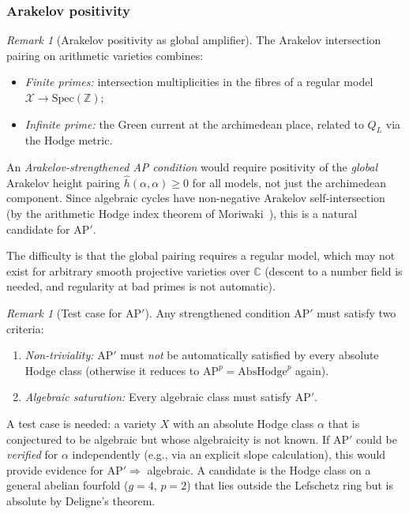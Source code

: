 \documentclass[aps,prd,twocolumn,superscriptaddress,nofootinbib]{revtex4-2}
\theoremstyle{definition}
\theoremstyle{remark}
\newtheorem{remark}[theorem]{Remark}
\begin{document}
\subsubsection{Arakelov positivity}

\begin{remark}[Arakelov positivity as global amplifier]
\label{rem:arakelov-positivity}
The Arakelov intersection pairing on arithmetic varieties combines:
\begin{itemize}
\item \textit{Finite primes:} intersection multiplicities in the fibres of a regular model $\mathcal{X} \to \mathrm{Spec}(\mathbb{Z})$;
\item \textit{Infinite prime:} the Green current at the archimedean place, related to $Q_L$ via the Hodge metric.
\end{itemize}
An \textit{Arakelov-strengthened AP condition} would require positivity of the \textit{global} Arakelov height pairing $\hat{h}(\alpha, \alpha) \geq 0$ for all models, not just the archimedean component. Since algebraic cycles have non-negative Arakelov self-intersection (by the arithmetic Hodge index theorem of Moriwaki~\cite{Moriwaki1999}), this is a natural candidate for AP$'$.

The difficulty is that the global pairing requires a regular model, which may not exist for arbitrary smooth projective varieties over $\mathbb{C}$ (descent to a number field is needed, and regularity at bad primes is not automatic).
\end{remark}

\begin{remark}[Test case for AP$'$]
\label{rem:test-case-ap-prime}
Any strengthened condition AP$'$ must satisfy two criteria:
\begin{enumerate}
\item \textit{Non-triviality:} AP$'$ must \textit{not} be automatically satisfied by every absolute Hodge class (otherwise it reduces to $\mathrm{AP}^p = \mathrm{AbsHodge}^p$ again).
\item \textit{Algebraic saturation:} Every algebraic class must satisfy AP$'$.
\end{enumerate}
A test case is needed: a variety $X$ with an absolute Hodge class $\alpha$ that is conjectured to be algebraic but whose algebraicity is not known. If AP$'$ could be \textit{verified} for $\alpha$ independently (e.g., via an explicit slope calculation), this would provide evidence for AP$' \Rightarrow$ algebraic. A candidate is the Hodge class on a general abelian fourfold ($g = 4$, $p = 2$) that lies outside the Lefschetz ring but is absolute by Deligne's theorem.
\end{remark}
\end{document}
